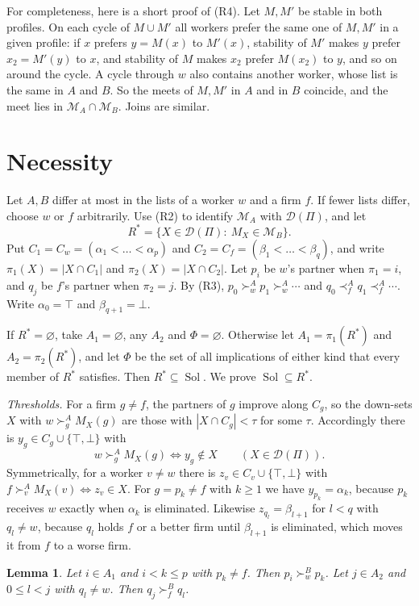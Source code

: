\documentclass[11pt]{amsart}
\newtheorem{lemma}[theorem]{Lemma}
\theoremstyle{definition}
\theoremstyle{remark}
\newcommand{\D}{\mathcal D}
\newcommand{\Sol}{\operatorname{Sol}}
\begin{document}
For completeness, here is a short proof of (R4). Let $M,M'$ be stable in both profiles. On each cycle of $M\cup M'$ all workers prefer the same one of $M,M'$ in a given profile: if $x$ prefers $y=M(x)$ to $M'(x)$, stability of $M'$ makes $y$ prefer $x_2=M'(y)$ to $x$, and stability of $M$ makes $x_2$ prefer $M(x_2)$ to $y$, and so on around the cycle. A cycle through $w$ also contains another worker, whose list is the same in $A$ and $B$. So the meets of $M,M'$ in $A$ and in $B$ coincide, and the meet lies in $\mathcal M_A\cap\mathcal M_B$. Joins are similar.

\section{Necessity}

Let $A,B$ differ at most in the lists of a worker $w$ and a firm $f$. If fewer lists differ, choose $w$ or $f$ arbitrarily. Use (R2) to identify $\mathcal M_A$ with $\D(\Pi)$, and let
\[
R^*=\{X\in\D(\Pi):\ M_X\in\mathcal M_B\}.
\]
Put $C_1=C_w=(\alpha_1<\dots<\alpha_p)$ and $C_2=C_f=(\beta_1<\dots<\beta_q)$, and write $\pi_1(X)=|X\cap C_1|$ and $\pi_2(X)=|X\cap C_2|$. Let $p_i$ be $w$'s partner when $\pi_1=i$, and $q_j$ be $f$'s partner when $\pi_2=j$. By (R3), $p_0\succ^A_w p_1\succ^A_w\cdots$ and $q_0\prec^A_f q_1\prec^A_f\cdots$. Write $\alpha_0=\top$ and $\beta_{q+1}=\bot$.

If $R^*=\varnothing$, take $A_1=\varnothing$, any $A_2$ and $\Phi=\varnothing$. Otherwise let $A_1=\pi_1(R^*)$ and $A_2=\pi_2(R^*)$, and let $\Phi$ be the set of all implications of either kind that every member of $R^*$ satisfies. Then $R^*\subseteq\Sol$. We prove $\Sol\subseteq R^*$.

\emph{Thresholds.} For a firm $g\ne f$, the partners of $g$ improve along $C_g$, so the down-sets $X$ with $w\succ^A_g M_X(g)$ are those with $|X\cap C_g|<\tau$ for some $\tau$. Accordingly there is $y_g\in C_g\cup\{\top,\bot\}$ with
\[
 w\succ^A_g M_X(g)\iff y_g\notin X\qquad(X\in\D(\Pi)).
\]
Symmetrically, for a worker $v\ne w$ there is $z_v\in C_v\cup\{\top,\bot\}$ with $f\succ^A_v M_X(v)\iff z_v\in X$. For $g=p_k\ne f$ with $k\ge1$ we have $y_{p_k}=\alpha_k$, because $p_k$ receives $w$ exactly when $\alpha_k$ is eliminated. Likewise $z_{q_l}=\beta_{l+1}$ for $l<q$ with $q_l\ne w$, because $q_l$ holds $f$ or a better firm until $\beta_{l+1}$ is eliminated, which moves it from $f$ to a worse firm.

\begin{lemma}\label{lem:order}
Let $i\in A_1$ and $i<k\le p$ with $p_k\ne f$. Then $p_i\succ^B_w p_k$. Let $j\in A_2$ and $0\le l<j$ with $q_l\ne w$. Then $q_j\succ^B_f q_l$.
\end{lemma}
\end{document}
